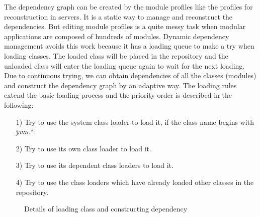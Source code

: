 \documentclass[conference]{IEEEtran}
\begin{document}
The dependency graph can be created by the module profiles like the profiles for reconstruction in servers.
It is a static way to manage and reconstruct the dependencies.
But editing module profiles is a quite messy task when modular applications are composed of hundreds of modules.
Dynamic dependency management avoids this work because it has a loading queue to make a try when loading classes.
The loaded class will be placed in the repository and the unloaded class will enter the loading queue again to wait for the next loading.
Due to continuous trying, we can obtain dependencies of all the classes (modules) and construct the dependency graph by an adaptive way.
The loading rules extend the basic loading process and the priority order is described in the following: 
\begin{itemize}[]
\item[1)] Try to use the system class loader to load it, if the class name begins with java.*.
\item[2)] Try to use its own class loader to load it.
\item[3)] Try to use its dependent class loaders to load it.
\item[4)] Try to use the class loaders which have already loaded other classes in the repository. 
\end{itemize}

\begin{figure}[ht]
\centering
{}
\hfil
{}
\hfil
{}
\caption{Details of loading class and constructing dependency}
\label{fig:loading_queue}
\end{figure}
\end{document}

